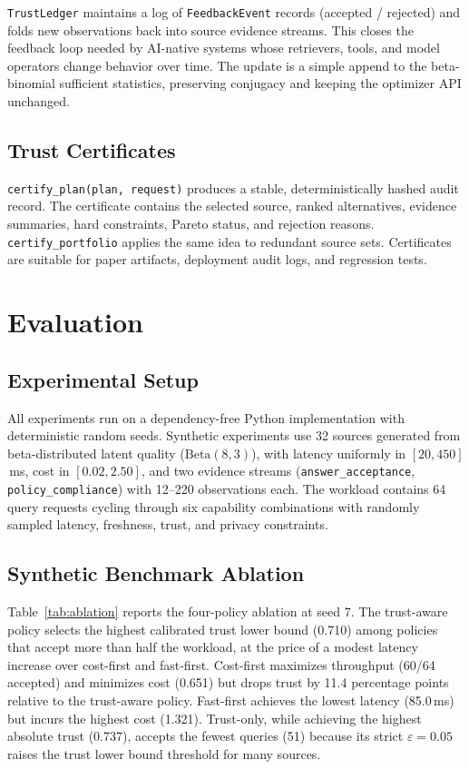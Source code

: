 \documentclass[runningheads]{llncs}
\begin{document}
\texttt{TrustLedger} maintains a log of \texttt{FeedbackEvent} records
(accepted / rejected) and folds new observations back into source
evidence streams.  This closes the feedback loop needed by AI-native
systems whose retrievers, tools, and model operators change behavior over
time.  The update is a simple append to the beta-binomial sufficient
statistics, preserving conjugacy and keeping the optimizer API unchanged.

\subsection{Trust Certificates}

\texttt{certify\_plan(plan, request)} produces a stable, deterministically
hashed audit record.  The certificate contains the selected source, ranked
alternatives, evidence summaries, hard constraints, Pareto status, and
rejection reasons.  \texttt{certify\_portfolio} applies the same idea to
redundant source sets.  Certificates are suitable for paper artifacts,
deployment audit logs, and regression tests.

\section{Evaluation}
\label{sec:eval}

\subsection{Experimental Setup}

All experiments run on a dependency-free Python implementation with
deterministic random seeds.  Synthetic experiments use 32 sources
generated from beta-distributed latent quality ($\text{Beta}(8,3)$),
with latency uniformly in $[20, 450]$\,ms, cost in $[0.02, 2.50]$, and
two evidence streams (\texttt{answer\_acceptance},
\texttt{policy\_compliance}) with 12--220 observations each.  The
workload contains 64 query requests cycling through six capability
combinations with randomly sampled latency, freshness, trust, and
privacy constraints.

\subsection{Synthetic Benchmark Ablation}
\label{sec:synth}

Table~\ref{tab:ablation} reports the four-policy ablation at seed 7.
The trust-aware policy selects the highest calibrated trust lower bound
(0.710) among policies that accept more than half the workload, at the
price of a modest latency increase over cost-first and fast-first.
Cost-first maximizes throughput (60/64 accepted) and minimizes cost
(0.651) but drops trust by 11.4 percentage points relative to the
trust-aware policy.  Fast-first achieves the lowest latency (85.0\,ms)
but incurs the highest cost (1.321).  Trust-only, while achieving the
highest absolute trust (0.737), accepts the fewest queries (51) because
its strict $\varepsilon = 0.05$ raises the trust lower bound threshold
for many sources.
\end{document}
